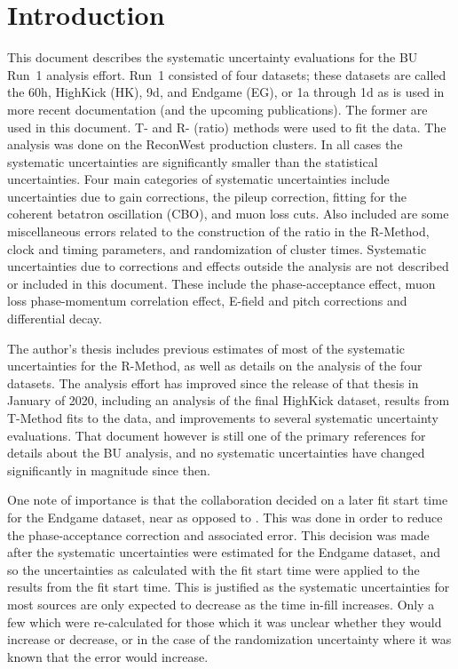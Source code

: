
\graphicspath{}

\section{Introduction}


This document describes the systematic uncertainty evaluations for the BU Run~1 \wa analysis effort. Run~1 consisted of four datasets; these datasets are called the 60h, HighKick (HK), 9d, and Endgame (EG), or 1a through 1d as is used in more recent documentation (and the upcoming publications). The former are used in this document. T- and R- (ratio) methods were used to fit the data. The analysis was done on the ReconWest production clusters. In all cases the systematic uncertainties are significantly smaller than the statistical uncertainties. Four main categories of systematic uncertainties include uncertainties due to gain corrections, the pileup correction, fitting for the coherent betatron oscillation (CBO), and muon loss cuts. Also included are some miscellaneous errors related to the construction of the ratio in the R-Method, clock and timing parameters, and randomization of cluster times. Systematic uncertainties due to corrections and effects outside the \wa analysis are not described or included in this document. These include the phase-acceptance effect, muon loss phase-momentum correlation effect, E-field and pitch corrections and differential decay.

The author's thesis \cite{phdthesis:2020Kinnaird} includes previous estimates of most of the systematic uncertainties for the R-Method, as well as details on the analysis of the four datasets. The analysis effort has improved since the release of that thesis in January of 2020, including an analysis of the final HighKick dataset, results from T-Method fits to the data, and improvements to several systematic uncertainty evaluations. That document however is still one of the primary references for details about the BU \wa analysis, and no systematic uncertainties have changed significantly in magnitude since then.

One note of importance is that the collaboration decided on a later fit start time for the Endgame dataset, near  as opposed to . This was done in order to reduce the phase-acceptance correction and associated error. This decision was made after the systematic uncertainties were estimated for the Endgame dataset, and so the uncertainties as calculated with the  fit start time were applied to the results from the  fit start time. This is justified as the systematic uncertainties for most sources are only expected to decrease as the time in-fill increases. Only a few which were re-calculated for those which it was unclear whether they would increase or decrease, or in the case of the randomization uncertainty where it was known that the error would increase.

